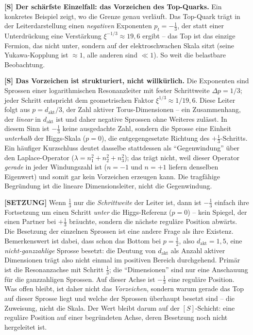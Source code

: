 \textbf{[S] Der schärfste Einzelfall: das Vorzeichen des Top-Quarks.} Ein
konkretes Beispiel zeigt, wo die Grenze genau verläuft. Das Top-Quark trägt in
der Leiterdarstellung einen \emph{negativen} Exponenten $p_t = -\tfrac13$, der
statt einer Unterdrückung eine Verstärkung $\xi^{-1/3}\approx 19{,}6$ ergibt --
das Top ist das einzige Fermion, das nicht unter, sondern auf der
elektroschwachen Skala sitzt (seine Yukawa-Kopplung ist $\approx 1$, alle
anderen sind $\ll 1$). So weit die belastbare Beobachtung.

\textbf{[S] Das Vorzeichen ist strukturiert, nicht willkürlich.} Die Exponenten
sind Sprossen einer logarithmischen Resonanzleiter mit fester Schrittweite
$\Delta p = 1/3$; jeder Schritt entspricht dem geometrischen Faktor
$\xi^{1/3}\approx 1/19{,}6$. Diese Leiter folgt aus $p = d_\text{akt}/3$, der Zahl
aktiver Torus-Dimensionen -- ein Zusammenhang, der \emph{linear} in
$d_\text{akt}$ ist und daher negative Sprossen ohne Weiteres zulässt. In diesem
Sinn ist $-\tfrac13$ keine ausgedachte Zahl, sondern die Sprosse eine Einheit
\emph{unterhalb} der Higgs-Skala ($p=0$), die entgegengesetzte Richtung des
$+\tfrac13$-Schritts. Ein häufiger Kurzschluss deutet dasselbe stattdessen als
\enquote{Gegenwindung} über den Laplace-Operator ($\lambda=n_1^2+n_2^2+n_3^2$);
das trägt nicht, weil dieser Operator \emph{gerade} in jeder Windungszahl ist
($n=-1$ und $n=+1$ liefern denselben Eigenwert) und somit gar kein Vorzeichen
erzeugen kann. Die tragfähige Begründung ist die lineare Dimensionsleiter, nicht
die Gegenwindung.

\textbf{[SETZUNG]} Wenn $\tfrac13$ nur die \emph{Schrittweite} der Leiter ist,
dann ist $-\tfrac13$ einfach ihre Fortsetzung um einen Schritt \emph{unter} die
Higgs-Referenz ($p=0$) -- kein Spiegel, der einen Partner bei $+\tfrac13$
bräuchte, sondern die nächste reguläre Position abwärts. Die Besetzung der
einzelnen Sprossen ist eine andere Frage als ihre Existenz. Bemerkenswert ist
dabei, dass schon das Bottom bei $p=\tfrac12$, also $d_\text{akt}=1{,}5$, eine
\emph{nicht-ganzzahlige} Sprosse besetzt: die Deutung von $d_\text{akt}$ als
Anzahl aktiver Dimensionen trägt also nicht einmal im positiven Bereich
durchgehend. Primär ist die Resonanzachse mit Schritt $\tfrac13$; die
\enquote{Dimensionen} sind nur eine Anschauung für die ganzzahligen Sprossen.
Auf dieser Achse ist $-\tfrac13$ eine reguläre Position. Was offen bleibt, ist
daher nicht das \emph{Vorzeichen}, sondern warum gerade das Top auf dieser
Sprosse liegt und welche der Sprossen überhaupt besetzt sind -- die Zuweisung,
nicht die Skala. Der Wert bleibt darum auf der $[S]$-Schicht: eine reguläre
Position auf einer begründeten Achse, deren Besetzung noch nicht hergeleitet
ist.

